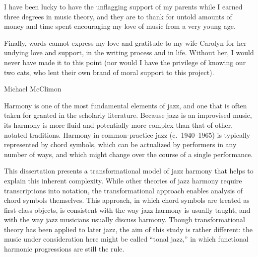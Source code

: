 I have been lucky to have the unflagging support of my parents while I earned
three degrees in music theory, and they are to thank for untold amounts of
money and time spent encouraging my love of music from a very young age.

Finally, words cannot express my love and gratitude to my wife Carolyn for her
undying love and support, in the writing process and in life. Without her, I
would never have made it to this point (nor would I have the privilege of
knowing our two cats, who lent their own brand of moral support to this
project).


\singlespacing

\clearpage


{}
\begin{center}
  Michael McClimon \\
  \vspace{0.5\baselineskip}
  {
    \MakeUppercase{\Title}
  }
\end{center}

\doublespacing

Harmony is one of the most fundamental elements of jazz, and one that is often
taken for granted in the scholarly literature. Because jazz is an improvised
music, its harmony is more fluid and potentially more complex than that of
other, notated traditions. Harmony in common-practice jazz (c.\ 1940--1965) is
typically represented by chord symbols, which can be actualized by performers
in any number of ways, and which might change over the course of a single
performance.

This dissertation presents a transformational model of jazz harmony that helps
to explain this inherent complexity. While other theories of jazz harmony
require transcriptions into notation, the transformational approach enables
analysis of chord symbols themselves. This approach, in which chord symbols
are treated as first-class objects, is consistent with the way jazz harmony is
usually taught, and with the way jazz musicians usually discuss harmony.
Though transformational theory has been applied to later jazz, the aim of this
study is rather different: the music under consideration here might be called
``tonal jazz,'' in which functional harmonic progressions are still the rule.

